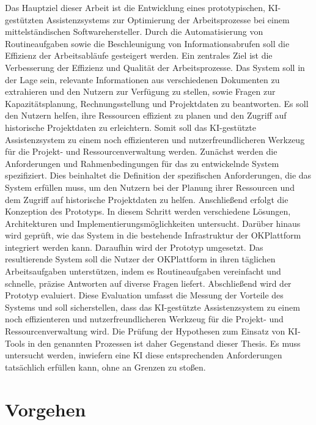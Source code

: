 Das Hauptziel dieser Arbeit ist die Entwicklung eines prototypischen, \ac{KI}-gestützten Assistenzsystems zur 
Optimierung der Arbeitsprozesse bei einem mittelständischen Softwarehersteller. Durch die 
Automatisierung von Routineaufgaben sowie die Beschleunigung von Informationsabrufen soll die 
Effizienz der Arbeitsabläufe gesteigert werden.
Ein zentrales Ziel ist die Verbesserung der Effizienz und Qualität der Arbeitsprozesse. Das System soll in 
der Lage sein, relevante Informationen aus verschiedenen Dokumenten zu extrahieren und den Nutzern 
zur Verfügung zu stellen, sowie Fragen zur Kapazitätsplanung, Rechnungsstellung und Projektdaten zu 
beantworten. Es soll den Nutzern helfen, ihre Ressourcen effizient zu planen und den Zugriff auf 
historische Projektdaten zu erleichtern. Somit soll das KI-gestützte Assistenzsystem zu einem noch 
effizienteren und nutzerfreundlicheren Werkzeug für die Projekt- und Ressourcenverwaltung werden.
Zunächst werden die Anforderungen und Rahmenbedingungen für das zu entwickelnde System 
spezifiziert. Dies beinhaltet die Definition der spezifischen Anforderungen, die das System erfüllen muss, 
um den Nutzern bei der Planung ihrer Ressourcen und dem Zugriff auf historische Projektdaten zu 
helfen.
Anschließend erfolgt die Konzeption des Prototyps. In diesem Schritt werden verschiedene Lösungen, 
Architekturen und Implementierungsmöglichkeiten untersucht. Darüber hinaus wird geprüft, wie das 
System in die bestehende Infrastruktur der OKPlattform integriert werden kann.
Daraufhin wird der Prototyp umgesetzt. Das resultierende System soll die Nutzer der OKPlattform in 
ihren täglichen Arbeitsaufgaben unterstützen, indem es Routineaufgaben vereinfacht und schnelle, 
präzise Antworten auf diverse Fragen liefert.
Abschließend wird der Prototyp evaluiert. Diese Evaluation umfasst die Messung der Vorteile des 
Systems und soll sicherstellen, dass das \ac{KI}-gestützte Assistenzsystem zu einem noch effizienteren und 
nutzerfreundlicheren Werkzeug für die Projekt- und Ressourcenverwaltung wird.
Die Prüfung der Hypothesen zum Einsatz von \ac{KI}-Tools in den genannten Prozessen ist daher Gegenstand 
dieser Thesis. Es muss untersucht werden, inwiefern eine \ac{KI} diese entsprechenden Anforderungen 
tatsächlich erfüllen kann, ohne an Grenzen zu stoßen.

\section{Vorgehen}

